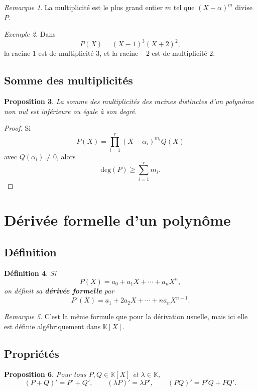 \documentclass[11pt,a4paper]{article}
\newtheorem{definition}{Définition}[section]
\newtheorem{proposition}[definition]{Proposition}
\theoremstyle{remark}
\newtheorem{remarque}[definition]{Remarque}
\newtheorem{exemple}[definition]{Exemple}
\newcommand{\K}{\mathbb{K}}
\newcommand{\degP}{\mathrm{deg}}
\begin{document}
\begin{remarque}
La multiplicité est le plus grand entier \(m\) tel que \((X-\alpha)^m\) divise \(P\).
\end{remarque}

\begin{exemple}
Dans
\[
P(X)=(X-1)^3(X+2)^2,
\]
la racine \(1\) est de multiplicité \(3\), et la racine \(-2\) est de multiplicité \(2\).
\end{exemple}

\subsection{Somme des multiplicités}

\begin{proposition}
La somme des multiplicités des racines distinctes d’un polynôme non nul est inférieure ou égale à son degré.
\end{proposition}

\begin{proof}
Si
\[
P(X)=\prod_{i=1}^r (X-\alpha_i)^{m_i}Q(X)
\]
avec \(Q(\alpha_i)\neq 0\), alors
\[
\degP(P)\ge \sum_{i=1}^r m_i.
\]
\end{proof}

\section{Dérivée formelle d’un polynôme}

\subsection{Définition}

\begin{definition}
Si
\[
P(X)=a_0+a_1X+\cdots+a_nX^n,
\]
on définit sa \textbf{dérivée formelle} par
\[
P'(X)=a_1+2a_2X+\cdots+na_nX^{n-1}.
\]
\end{definition}

\begin{remarque}
C’est la même formule que pour la dérivation usuelle, mais ici elle est définie algébriquement dans \(\K[X]\).
\end{remarque}

\subsection{Propriétés}

\begin{proposition}
Pour tous \(P,Q\in\K[X]\) et \(\lambda\in\K\),
\[
(P+Q)'=P'+Q',
\qquad
(\lambda P)'=\lambda P',
\qquad
(PQ)'=P'Q+PQ'.
\]
\end{proposition}
\end{document}
